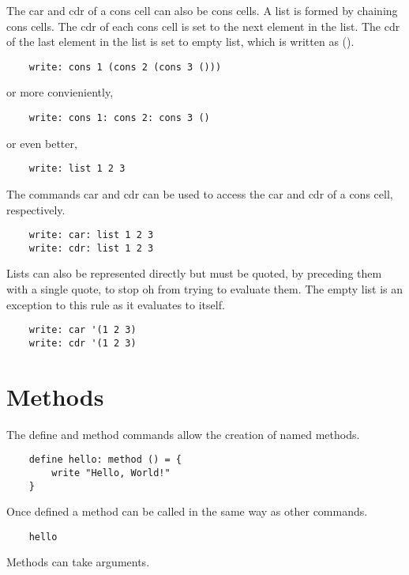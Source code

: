 \documentclass[12pt]{book}
\begin{document}
The car and cdr of a cons cell can also be cons cells. A list is formed
by chaining cons cells. The cdr of each cons cell is set to the next
element in the list. The cdr of the last element in the list is set to
empty list, which is written as ().

\begin{lstlisting}
	write: cons 1 (cons 2 (cons 3 ()))
\end{lstlisting}

or more convieniently,

\begin{lstlisting}
	write: cons 1: cons 2: cons 3 ()
\end{lstlisting}

or even better,

\begin{lstlisting}
	write: list 1 2 3
\end{lstlisting}

The commands car and cdr can be used to access the car and cdr of a
cons cell, respectively.

\begin{lstlisting}
	write: car: list 1 2 3
	write: cdr: list 1 2 3
\end{lstlisting}

Lists can also be represented directly but must be quoted, by preceding
them with a single quote, to stop oh from trying to evaluate them. The
empty list is an exception to this rule as it evaluates to itself.

\begin{lstlisting}
	write: car '(1 2 3)
	write: cdr '(1 2 3)
\end{lstlisting}


\section{Methods}

The define and method commands allow the creation of named methods.

\begin{lstlisting}
	define hello: method () = {
		write "Hello, World!"
	}
\end{lstlisting}

Once defined a method can be called in the same way as other commands.

\begin{lstlisting}
	hello
\end{lstlisting}

Methods can take arguments.
\end{document}
